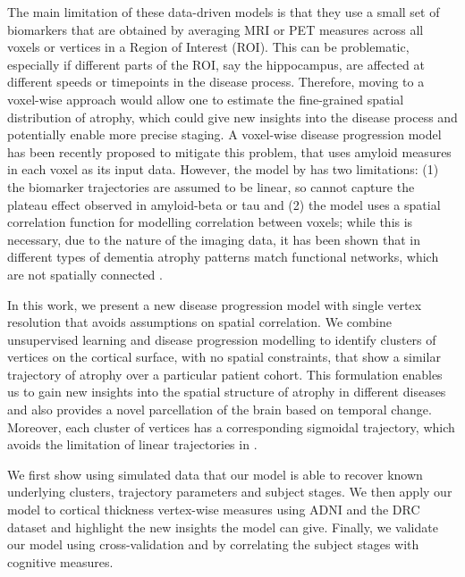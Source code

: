 \documentclass{llncs}
\begin{document}
The main limitation of these data-driven models is that they use a small set of biomarkers that are obtained by averaging MRI or PET measures across all voxels or vertices in a Region of Interest (ROI). This can be problematic, especially if different parts of the ROI, say the hippocampus, are affected at different speeds or timepoints in the disease process. Therefore, moving to a voxel-wise approach would allow one to estimate the fine-grained spatial distribution of atrophy, which could give new insights into the disease process and potentially enable more precise staging. A voxel-wise disease progression model \cite{bilgel2016multivariate} has been recently proposed to mitigate this problem, that uses amyloid measures in each voxel as its input data. However, the model by \cite{bilgel2016multivariate} has two limitations: (1) the biomarker trajectories are assumed to be linear, so cannot capture the plateau effect observed in amyloid-beta or tau and (2) the model uses a spatial correlation function for modelling correlation between voxels; while this is necessary, due to the nature of the imaging data, it has been shown that in different types of dementia atrophy patterns match functional networks, which are not spatially connected \cite{seeley2009neurodegenerative}.

In this work, we present a new disease progression model with single vertex resolution that avoids assumptions on spatial correlation. We combine unsupervised learning and disease progression modelling to identify clusters of vertices on the cortical surface, with no spatial constraints, that show a similar trajectory of atrophy over a particular patient cohort. This formulation enables us to gain new insights into the spatial structure of atrophy in different diseases and also provides a novel parcellation of the brain based on temporal change. Moreover, each cluster of vertices has a corresponding sigmoidal trajectory, which avoids the limitation of linear trajectories in \cite{bilgel2016multivariate}. 

We first show using simulated data that our model is able to recover known underlying clusters, trajectory parameters and subject stages. We then apply our model to cortical thickness vertex-wise measures using ADNI and the DRC dataset and highlight the new insights the model can give. Finally, we validate our model using cross-validation and by correlating the subject stages with cognitive measures.
\end{document}
